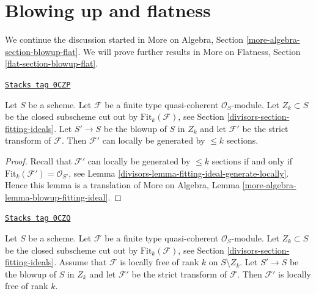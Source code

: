 \section{Blowing up and flatness}
\label{divisors-section-blowup-flat}
We continue the discussion started in
More on Algebra, Section \ref{more-algebra-section-blowup-flat}.
We will prove further results in More on Flatness, Section
\ref{flat-section-blowup-flat}.


\begin{lemma}
\label{divisors-lemma-strict-transform-blowup-fitting-ideal}
\href{https://stacks.math.columbia.edu/tag/0CZP}{\texttt{Stacks tag 0CZP}}

Let $S$ be a scheme. Let $\mathcal{F}$ be a finite type
quasi-coherent $\mathcal{O}_S$-module. Let $Z_k \subset S$ be the closed
subscheme cut out by $\text{Fit}_k(\mathcal{F})$, see
Section \ref{divisors-section-fitting-ideals}.
Let $S' \to S$ be the blowup of $S$ in $Z_k$ and let
$\mathcal{F}'$ be the strict transform of $\mathcal{F}$.
Then $\mathcal{F}'$ can locally be generated by $\leq k$
sections.
\end{lemma}

\begin{proof}

Recall that $\mathcal{F}'$ can locally be generated by $\leq k$
sections if and only if $\text{Fit}_k(\mathcal{F}') = \mathcal{O}_{S'}$, see
Lemma \ref{divisors-lemma-fitting-ideal-generate-locally}.
Hence this lemma is a translation of
More on Algebra, Lemma \ref{more-algebra-lemma-blowup-fitting-ideal}.
\end{proof}

\begin{lemma}
\label{divisors-lemma-strict-transform-blowup-fitting-ideal-locally-free}
\href{https://stacks.math.columbia.edu/tag/0CZQ}{\texttt{Stacks tag 0CZQ}}

Let $S$ be a scheme. Let $\mathcal{F}$ be a finite type
quasi-coherent $\mathcal{O}_S$-module. Let $Z_k \subset S$ be the closed
subscheme cut out by $\text{Fit}_k(\mathcal{F})$, see
Section \ref{divisors-section-fitting-ideals}.
Assume that $\mathcal{F}$ is locally free of rank $k$ on $S \setminus Z_k$.
Let $S' \to S$ be the blowup of $S$ in $Z_k$ and let
$\mathcal{F}'$ be the strict transform of $\mathcal{F}$.
Then $\mathcal{F}'$ is locally free of rank $k$.
\end{lemma}

